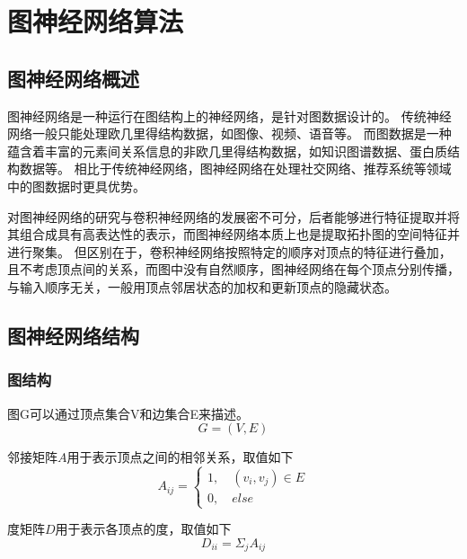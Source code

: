 
\chapter{图神经网络算法}

\section{图神经网络概述}

图神经网络是一种运行在图结构上的神经网络，是针对图数据设计的。
传统神经网络一般只能处理欧几里得结构数据，如图像、视频、语音等。
而图数据是一种蕴含着丰富的元素间关系信息的非欧几里得结构数据，如知识图谱数据、蛋白质结构数据等。
相比于传统神经网络，图神经网络在处理社交网络、推荐系统等领域中的图数据时更具优势。

对图神经网络的研究与卷积神经网络的发展密不可分，后者能够进行特征提取并将其组合成具有高表达性的表示，而图神经网络本质上也是提取拓扑图的空间特征并进行聚集。
但区别在于，卷积神经网络按照特定的顺序对顶点的特征进行叠加，且不考虑顶点间的关系，而图中没有自然顺序，图神经网络在每个顶点分别传播，与输入顺序无关，一般用顶点邻居状态的加权和更新顶点的隐藏状态。

\section{图神经网络结构}

\subsection{图结构}
\begin{definition}
    图G可以通过顶点集合V和边集合E来描述。
    \begin{equation}
        G=(V,E)
    \end{equation}
\end{definition}

\begin{definition}
    邻接矩阵$A$用于表示顶点之间的相邻关系，取值如下
    \begin{equation}
    A_{ij}=\left\{ \begin{array}{lr}1, \quad (v_i,v_j)\in E\\0,\quad else \end{array}\right.
    \end{equation}
\end{definition}

\begin{definition}
    度矩阵$D$用于表示各顶点的度，取值如下
    \begin{equation}
        D_{ii}=\Sigma _jA_{ij}
    \end{equation}
\end{definition}

